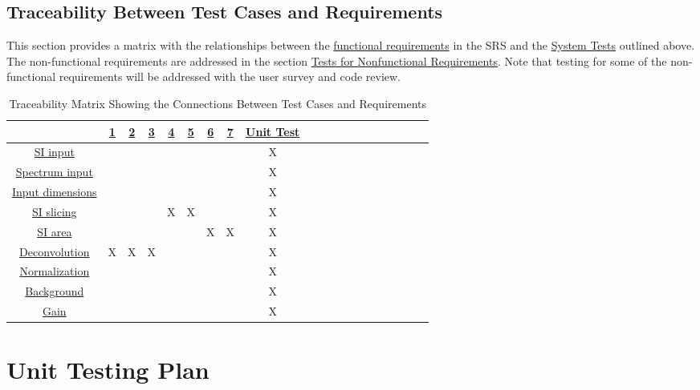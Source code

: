 \documentclass[12pt, titlepage]{article}
\begin{document}
\subsection{Traceability Between Test Cases and Requirements}
This section provides a matrix with the relationships between the
\hyperref[subsec:FR]{functional requirements} in the SRS and the
\hyperref[subsec:FuncReqTest]{System Tests} outlined above. The non-functional
requirements are addressed in the section \hyperref[subsec:NonfuncReqTest]{Tests
for Nonfunctional Requirements}. Note that testing for some of the
non-functional requirements will be addressed with the user survey and code
review.
\begin{table}[h]
	\centering
	\begin{tabular}{|c|c|c|c|c|c|c|c|c|c|c|c|c|c|c|c|c|c|c|c|}
		\hline 
		& \hyperref[TFR:RLblankPSF]{1} & \hyperref[TFR:RLerror]{2} &
\hyperref[TFR:RLSNR]{3} &  \hyperref[TFR:ImgExport]{4} &
\hyperref[TFR:ImgExportGUI]{5} & \hyperref[TFR:SpecExport]{6}&
\hyperref[TFR:SpecExportGUI]{7} & \hyperref[sec:UnitTest]{Unit Test} \\
		\hline
		\hyperref[R_SI_inputs]{SI input}     			&  &  &  &  &  &  &  & X\\ 
		\hline
		\hyperref[R_spectrum_inputs]{Spectrum input}    &  &  &  &  &  &  &  & X\\ 
		\hline
		\hyperref[R_Input_dimension]{Input dimensions}  &  &  &  &  &  &  &  & X\\
		\hline
		\hyperref[R_SI_slicing]{SI slicing}				&  &  &  & X& X&  &  & X\\ 
		\hline
		\hyperref[R_SI_area]{SI area}          			&  &  &  &  &  & X& X& X\\ 
		\hline
		\hyperref[R_deconvolution]{Deconvolution}       & X& X& X&  &  &  &  & X\\ 
		\hline
		\hyperref[R_normalization]{Normalization} 		&  &  &  &  &  &  &  & X\\ 
		\hline
		\hyperref[R_background]{Background} 			&  &  &  &  &  &  &  & X\\ 
		\hline
		\hyperref[R_gain]{Gain}  						&  &  &  &  &  &  &  & X\\ 
		\hline
	\end{tabular}
	\caption{Traceability Matrix Showing the Connections Between Test Cases and
Requirements}
	\label{Table:A_trace}
\end{table}

				
\section{Unit Testing Plan}
\label{sec:UnitTest}
\end{document}
